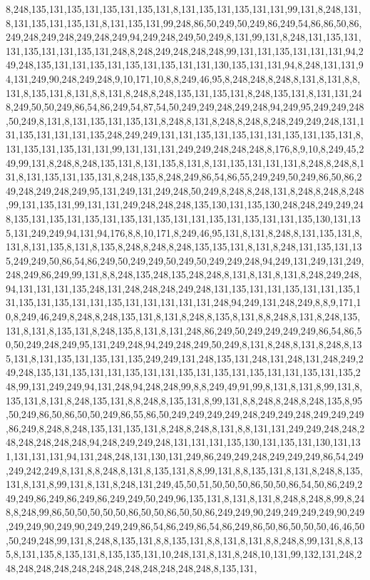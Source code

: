 8,248,135,131,135,131,135,131,135,131,8,131,135,131,135,131,131,99,131,8,248,131,8,131,135,131,135,131,8,131,135,131,99,248,86,50,249,50,249,86,249,54,86,86,50,86,249,248,249,248,249,248,249,94,249,248,249,50,249,8,131,99,131,8,248,131,135,131,131,135,131,131,135,131,248,8,248,249,248,248,248,99,131,131,135,131,131,131,94,249,248,135,131,131,135,131,135,131,135,131,131,130,135,131,131,94,8,248,131,131,94,131,249,90,248,249,248,9,10,171,10,8,8,249,46,95,8,248,248,8,248,8,131,8,131,8,8,131,8,135,131,8,131,8,8,131,8,248,8,248,135,131,135,131,8,248,135,131,8,131,131,248,249,50,50,249,86,54,86,249,54,87,54,50,249,249,248,249,248,94,249,95,249,249,248,50,249,8,131,8,131,135,131,135,131,8,248,8,131,8,248,8,248,8,248,249,249,248,131,131,135,131,131,131,135,248,249,249,131,131,135,131,135,131,131,135,131,135,131,8,131,135,131,135,131,131,99,131,131,131,249,249,248,248,248,8,176,8,9,10,8,249,45,249,99,131,8,248,8,248,135,131,8,131,135,8,131,8,131,135,131,131,131,8,248,8,248,8,131,8,131,135,131,135,131,8,248,135,8,248,249,86,54,86,55,249,249,50,249,86,50,86,249,248,249,248,249,95,131,249,131,249,248,50,249,8,248,8,248,131,8,248,8,248,8,248,99,131,135,131,99,131,131,249,248,248,248,135,130,131,135,130,248,248,249,249,248,135,131,135,131,135,131,135,131,135,131,131,135,131,135,131,131,135,130,131,135,131,249,249,94,131,94,176,8,8,10,171,8,249,46,95,131,8,131,8,248,8,131,135,131,8,131,8,131,135,8,131,8,135,8,248,8,248,8,248,135,135,131,8,131,8,248,131,135,131,135,249,249,50,86,54,86,249,50,249,249,50,249,50,249,249,248,94,249,131,249,131,249,248,249,86,249,99,131,8,8,248,135,248,135,248,248,8,131,8,131,8,131,8,248,249,248,94,131,131,131,135,248,131,248,248,248,249,248,131,135,131,131,135,131,131,135,131,135,131,135,131,131,135,131,131,131,131,131,248,94,249,131,248,249,8,8,9,171,10,8,249,46,249,8,248,8,248,135,131,8,131,8,248,8,135,8,131,8,8,248,8,131,8,248,135,131,8,131,8,135,131,8,248,135,8,131,8,131,248,86,249,50,249,249,249,249,86,54,86,50,50,249,248,249,95,131,249,248,94,249,248,249,50,249,8,131,8,248,8,131,8,248,8,135,131,8,131,135,131,135,131,135,249,249,131,248,135,131,248,131,248,131,248,249,249,248,135,131,135,131,131,135,131,131,135,131,135,131,135,131,131,135,131,135,248,99,131,249,249,94,131,248,94,248,248,99,8,8,249,49,91,99,8,131,8,131,8,99,131,8,135,131,8,131,8,248,135,131,8,8,248,8,135,131,8,99,131,8,8,248,8,248,8,248,135,8,95,50,249,86,50,86,50,50,249,86,55,86,50,249,249,249,249,248,249,249,248,249,249,249,86,249,8,248,8,248,135,131,135,131,8,248,8,248,8,131,8,8,131,131,249,249,248,248,248,248,248,248,248,94,248,249,249,248,131,131,131,135,130,131,135,131,130,131,131,131,131,131,94,131,248,248,131,130,131,249,86,249,249,248,249,249,249,86,54,249,249,242,249,8,131,8,8,248,8,131,8,135,131,8,8,99,131,8,8,135,131,8,131,8,248,8,135,131,8,131,8,99,131,8,131,8,248,131,249,45,50,51,50,50,50,86,50,50,86,54,50,86,249,249,249,86,249,86,249,86,249,249,50,249,96,135,131,8,131,8,131,8,248,8,248,8,99,8,248,8,248,99,86,50,50,50,50,50,86,50,50,86,50,50,86,249,249,90,249,249,249,249,90,249,249,249,90,249,90,249,249,249,86,54,86,249,86,54,86,249,86,50,86,50,50,50,46,46,50,50,249,248,99,131,8,248,8,135,131,8,8,135,131,8,8,131,8,131,8,8,248,8,99,131,8,8,135,8,131,135,8,135,131,8,135,135,131,10,248,131,8,131,8,248,10,131,99,132,131,248,248,248,248,248,248,248,248,248,248,248,248,248,8,135,131,
